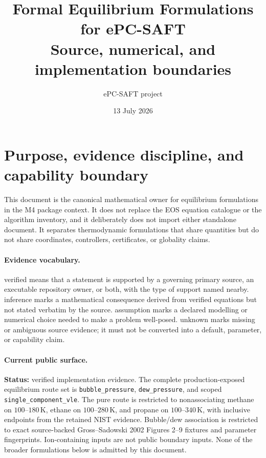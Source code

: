 \documentclass[11pt]{article}
\title{Formal Equilibrium Formulations for ePC-SAFT\\
\large Source, numerical, and implementation boundaries}
\author{ePC-SAFT project}
\date{13 July 2026}
\newcommand{\Evidence}[1]{\textsf{#1}}
\newcommand{\Status}[1]{\textbf{Status:} \Evidence{#1}.}
\begin{document}
\maketitle
\tableofcontents

\section{Purpose, evidence discipline, and capability boundary}
\label{sec:eqform:purpose}

This document is the canonical mathematical owner for equilibrium formulations
in the M4 package context. It does not replace the EOS equation catalogue or
the algorithm inventory, and it deliberately does not import either standalone
document. It separates thermodynamic formulations that share quantities but
do not share coordinates, controllers, certificates, or globality claims.

\paragraph{Evidence vocabulary.}
\Evidence{verified} means that a statement is supported by a governing primary
source, an executable repository owner, or both, with the type of support named
nearby. \Evidence{inference} marks a mathematical consequence derived from
verified equations but not stated verbatim by the source. \Evidence{assumption}
marks a declared modelling or numerical choice needed to make a problem
well-posed. \Evidence{unknown} marks missing or ambiguous source evidence; it
must not be converted into a default, parameter, or capability claim.

\paragraph{Current public surface.}
\Status{verified implementation evidence}
The complete production-exposed equilibrium route set is
\texttt{bubble\_pressure}, \texttt{dew\_pressure}, and scoped
\texttt{single\_component\_vle}. The pure route is restricted to
nonassociating methane on \(100\)--\(180\,\mathrm{K}\), ethane on
\(100\)--\(280\,\mathrm{K}\), and propane on \(100\)--\(340\,\mathrm{K}\),
with inclusive endpoints from the retained NIST evidence. Bubble/dew
association is restricted to exact source-backed Gross--Sadowski 2002
Figures 2--9 fixtures and parameter fingerprints. Ion-containing inputs are
not public boundary inputs. None of the broader formulations below is admitted
by this document.
\end{document}
